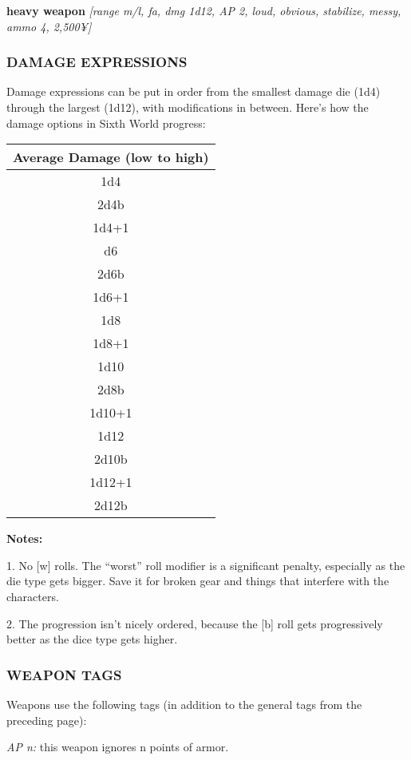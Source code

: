 \documentclass[oneside,10pt]{article}
\begin{document}
\begin{multicols}{2}
\textbf{heavy weapon} \textit{[range m/l, fa, dmg 1d12, AP 2, loud,
obvious, stabilize, messy, ammo 4, 2,500¥]}

\subsubsection{DAMAGE EXPRESSIONS}
Damage expressions can be put in order from the smallest
damage die (1d4) through the largest (1d12), with modifications in between. Here’s how the damage options in Sixth
World progress:

\begin{center}
\begin{tabular}{c}
\toprule
Average Damage (low to high)\\
\midrule
1d4 \\
2d4b \\
1d4+1 \\
d6 \\
2d6b \\
1d6+1 \\
1d8 \\
1d8+1 \\
1d10 \\
2d8b \\
1d10+1 \\
1d12 \\
2d10b \\
1d12+1 \\
2d12b \\
\bottomrule
\end{tabular}
\end{center}

\textbf{Notes:}
\begin{adjustwidth*}{.5cm}{.5cm}
1. No [w] rolls. The
“worst” roll modifier is
a significant penalty,
especially as the die type
gets bigger. Save it for
broken gear and things
that interfere with the
characters.

2. The progression isn’t
nicely ordered, because
the [b] roll gets progressively better as the dice
type gets higher.
\end{adjustwidth*}

\subsubsection{WEAPON TAGS}
Weapons use the following tags (in addition to the general
tags from the preceding page):
\begin{adjustwidth*}{.5cm}{.5cm}

\textit{AP n:} this weapon ignores n points of armor.


\end{adjustwidth*}
\end{multicols}
\end{document}
